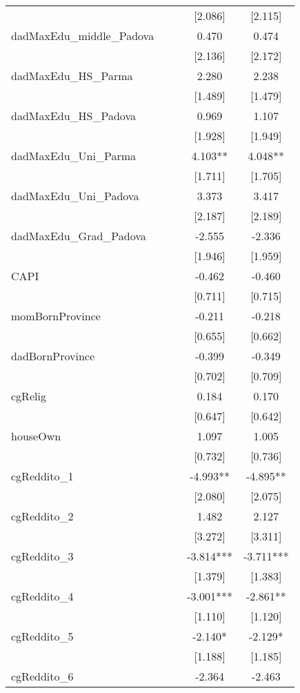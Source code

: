 \documentclass[]{article}
\begin{document}
\begin{tabular}{lcccc}
 &  &  & [2.086] & [2.115] \\
dadMaxEdu\_middle\_Padova &  &  & 0.470 & 0.474 \\
 &  &  & [2.136] & [2.172] \\
dadMaxEdu\_HS\_Parma &  &  & 2.280 & 2.238 \\
 &  &  & [1.489] & [1.479] \\
dadMaxEdu\_HS\_Padova &  &  & 0.969 & 1.107 \\
 &  &  & [1.928] & [1.949] \\
dadMaxEdu\_Uni\_Parma &  &  & 4.103** & 4.048** \\
 &  &  & [1.711] & [1.705] \\
dadMaxEdu\_Uni\_Padova &  &  & 3.373 & 3.417 \\
 &  &  & [2.187] & [2.189] \\
dadMaxEdu\_Grad\_Padova &  &  & -2.555 & -2.336 \\
 &  &  & [1.946] & [1.959] \\
CAPI &  &  & -0.462 & -0.460 \\
 &  &  & [0.711] & [0.715] \\
momBornProvince &  &  & -0.211 & -0.218 \\
 &  &  & [0.655] & [0.662] \\
dadBornProvince &  &  & -0.399 & -0.349 \\
 &  &  & [0.702] & [0.709] \\
cgRelig &  &  & 0.184 & 0.170 \\
 &  &  & [0.647] & [0.642] \\
houseOwn &  &  & 1.097 & 1.005 \\
 &  &  & [0.732] & [0.736] \\
cgReddito\_1 &  &  & -4.993** & -4.895** \\
 &  &  & [2.080] & [2.075] \\
cgReddito\_2 &  &  & 1.482 & 2.127 \\
 &  &  & [3.272] & [3.311] \\
cgReddito\_3 &  &  & -3.814*** & -3.711*** \\
 &  &  & [1.379] & [1.383] \\
cgReddito\_4 &  &  & -3.001*** & -2.861** \\
 &  &  & [1.110] & [1.120] \\
cgReddito\_5 &  &  & -2.140* & -2.129* \\
 &  &  & [1.188] & [1.185] \\
cgReddito\_6 &  &  & -2.364 & -2.463 \\

\end{tabular}
\end{document}
